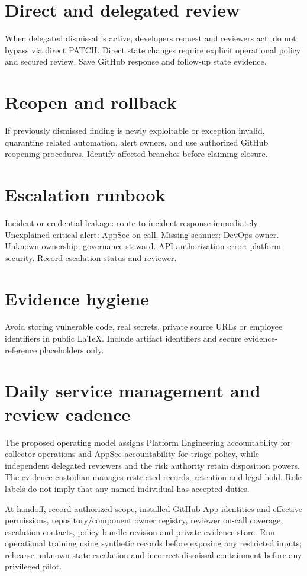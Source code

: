 \documentclass[11pt,letterpaper]{article}
\begin{document}
\section{Direct and delegated review}
When delegated dismissal is active, developers request and reviewers act; do not bypass via direct PATCH. Direct state changes require explicit operational policy and secured review. Save GitHub response and follow-up state evidence.


\section{Reopen and rollback}
If previously dismissed finding is newly exploitable or exception invalid, quarantine related automation, alert owners, and use authorized GitHub reopening procedures. Identify affected branches before claiming closure.


\section{Escalation runbook}
Incident or credential leakage: route to incident response immediately. Unexplained critical alert: AppSec on-call. Missing scanner: DevOps owner. Unknown ownership: governance steward. API authorization error: platform security. Record escalation status and reviewer.


\section{Evidence hygiene}
Avoid storing vulnerable code, real secrets, private source URLs or employee identifiers in public LaTeX. Include artifact identifiers and secure evidence-reference placeholders only.


\section{Daily service management and review cadence}
The proposed operating model assigns Platform Engineering accountability for collector operations and AppSec accountability for triage policy, while independent delegated reviewers and the risk authority retain disposition powers. The evidence custodian manages restricted records, retention and legal hold. Role labels do not imply that any named individual has accepted duties.

At handoff, record authorized scope, installed GitHub App identities and effective permissions, repository/component owner registry, reviewer on-call coverage, escalation contacts, policy bundle revision and private evidence store. Run operational training using synthetic records before exposing any restricted inputs; rehearse unknown-state escalation and incorrect-dismissal containment before any privileged pilot.
\end{document}
